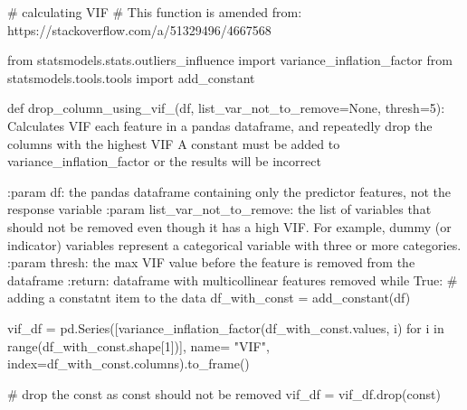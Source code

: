 \documentclass[
  letterpaper,
  DIV=11,
  numbers=noendperiod]{scrreprt}
\newenvironment{Shaded}{\begin{snugshade}}{\end{snugshade}}
\newcommand{\BuiltInTok}[1]{\textcolor[rgb]{0.00,0.23,0.31}{#1}}
\newcommand{\CommentTok}[1]{\textcolor[rgb]{0.37,0.37,0.37}{#1}}
\newcommand{\ControlFlowTok}[1]{\textcolor[rgb]{0.00,0.23,0.31}{#1}}
\newcommand{\DecValTok}[1]{\textcolor[rgb]{0.68,0.00,0.00}{#1}}
\newcommand{\ImportTok}[1]{\textcolor[rgb]{0.00,0.46,0.62}{#1}}
\newcommand{\KeywordTok}[1]{\textcolor[rgb]{0.00,0.23,0.31}{#1}}
\newcommand{\NormalTok}[1]{\textcolor[rgb]{0.00,0.23,0.31}{#1}}
\newcommand{\OperatorTok}[1]{\textcolor[rgb]{0.37,0.37,0.37}{#1}}
\newcommand{\StringTok}[1]{\textcolor[rgb]{0.13,0.47,0.30}{#1}}
\newcommand{\VariableTok}[1]{\textcolor[rgb]{0.07,0.07,0.07}{#1}}
\begin{document}
\begin{Shaded}
\begin{Highlighting}[]
\CommentTok{\# calculating VIF}
\CommentTok{\# This function is amended from: https://stackoverflow.com/a/51329496/4667568}

\ImportTok{from}\NormalTok{ statsmodels.stats.outliers\_influence }\ImportTok{import}\NormalTok{ variance\_inflation\_factor }
\ImportTok{from}\NormalTok{ statsmodels.tools.tools }\ImportTok{import}\NormalTok{ add\_constant}

\KeywordTok{def}\NormalTok{ drop\_column\_using\_vif\_(df, list\_var\_not\_to\_remove}\OperatorTok{=}\VariableTok{None}\NormalTok{, thresh}\OperatorTok{=}\DecValTok{5}\NormalTok{):}
    \CommentTok{\textquotesingle{}\textquotesingle{}\textquotesingle{}}
\CommentTok{    Calculates VIF each feature in a pandas dataframe, and repeatedly drop the columns with the highest VIF}
\CommentTok{    A constant must be added to variance\_inflation\_factor or the results will be incorrect}

\CommentTok{    :param df: the pandas dataframe containing only the predictor features, not the response variable}
\CommentTok{    :param list\_var\_not\_to\_remove: the list of variables that should not be removed even though it has a high VIF. For example, dummy (or indicator) variables represent a categorical variable with three or more categories.}
\CommentTok{    :param thresh: the max VIF value before the feature is removed from the dataframe}
\CommentTok{    :return: dataframe with multicollinear features removed}
\CommentTok{    \textquotesingle{}\textquotesingle{}\textquotesingle{}}
    \ControlFlowTok{while} \VariableTok{True}\NormalTok{:}
        \CommentTok{\# adding a constatnt item to the data}
\NormalTok{        df\_with\_const }\OperatorTok{=}\NormalTok{ add\_constant(df)}

\NormalTok{        vif\_df }\OperatorTok{=}\NormalTok{ pd.Series([variance\_inflation\_factor(df\_with\_const.values, i) }
               \ControlFlowTok{for}\NormalTok{ i }\KeywordTok{in} \BuiltInTok{range}\NormalTok{(df\_with\_const.shape[}\DecValTok{1}\NormalTok{])], name}\OperatorTok{=} \StringTok{"VIF"}\NormalTok{,}
\NormalTok{              index}\OperatorTok{=}\NormalTok{df\_with\_const.columns).to\_frame()}

        \CommentTok{\# drop the const as const should not be removed}
\NormalTok{        vif\_df }\OperatorTok{=}\NormalTok{ vif\_df.drop(}\StringTok{\textquotesingle{}const\textquotesingle{}}\NormalTok{)}
        

\end{Highlighting}
\end{Shaded}
\end{document}
